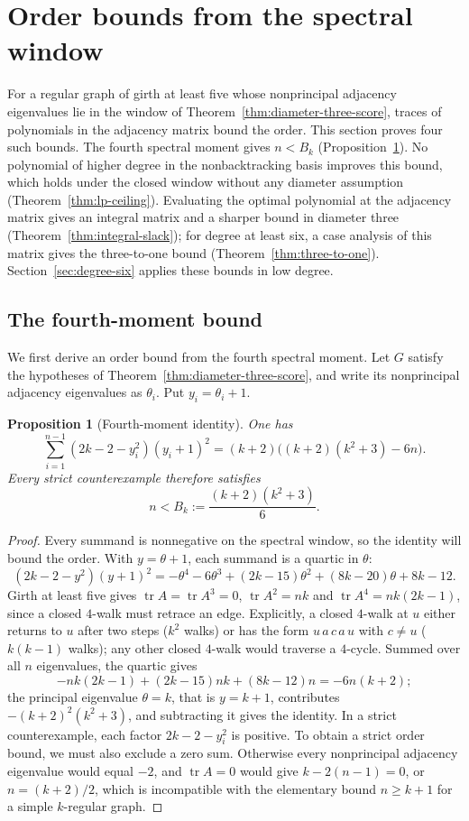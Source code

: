 \documentclass[a4paper,10pt,reqno]{amsart}
\theoremstyle{plain}
\newtheorem{proposition}[theorem]{Proposition}
\theoremstyle{definition}
\theoremstyle{remark}
\newcommand{\tr}{\operatorname{tr}}
\newcommand{\resultbox}[1]{\boxed{#1}}
\begin{document}
\section{Order bounds from the spectral window}\label{sec:lp}

For a regular graph of girth at least five whose nonprincipal adjacency
eigenvalues lie in the window of Theorem~\ref{thm:diameter-three-score},
traces of polynomials in the adjacency matrix bound the order. This section
proves four such bounds. The fourth spectral moment gives \(n<B_k\)
(Proposition~\ref{prop:moment-bound}). No polynomial of higher degree in the
nonbacktracking basis improves this bound, which holds under the closed
window without any diameter assumption (Theorem~\ref{thm:lp-ceiling}).
Evaluating the optimal polynomial at the adjacency matrix gives an integral
matrix and a sharper bound in diameter three
(Theorem~\ref{thm:integral-slack}); for degree at least six, a case analysis
of this matrix gives the three-to-one bound
(Theorem~\ref{thm:three-to-one}). Section~\ref{sec:degree-six} applies these
bounds in low degree.

\subsection{The fourth-moment bound}

We first derive an order bound from the fourth spectral moment.
Let \(G\) satisfy the hypotheses of Theorem~\ref{thm:diameter-three-score}, and
write its nonprincipal adjacency eigenvalues as \(\theta_i\).  Put
\(y_i=\theta_i+1\).

\begin{proposition}[Fourth-moment identity]\label{prop:moment-bound}
One has
\[
 \sum_{i=1}^{n-1}(2k-2-y_i^2)(y_i+1)^2
 =(k+2)\bigl((k+2)(k^2+3)-6n\bigr).
\]
Every strict counterexample therefore satisfies
\[
 \resultbox{
 n< B_k:=\frac{(k+2)(k^2+3)}6.
 }
\]
\end{proposition}

\begin{proof}
Every summand is nonnegative on the spectral window, so the identity
will bound the order. With \(y=\theta+1\), each summand is a quartic in
\(\theta\):
\[
 (2k-2-y^2)(y+1)^2=-\theta^4-6\theta^3+(2k-15)\theta^2+(8k-20)\theta+8k-12.
\]
Girth at least five gives \(\tr A=\tr A^3=0\), \(\tr A^2=nk\) and
\(\tr A^4=nk(2k-1)\), since a closed \(4\)-walk must retrace an edge.
Explicitly, a closed \(4\)-walk at \(u\) either returns to \(u\) after two
steps (\(k^2\) walks) or has the form \(u\,a\,c\,a\,u\) with \(c\ne u\)
(\(k(k-1)\) walks); any other closed \(4\)-walk would traverse a
\(4\)-cycle. Summed over all \(n\) eigenvalues, the quartic gives
\[
 -nk(2k-1)+(2k-15)nk+(8k-12)n=-6n(k+2);
\]
the principal eigenvalue \(\theta=k\), that is \(y=k+1\), contributes
\(-(k+2)^2(k^2+3)\), and subtracting it gives the identity.
In a strict counterexample, each factor \(2k-2-y_i^2\) is positive.
To obtain a strict order bound, we must also exclude a zero sum. Otherwise every nonprincipal adjacency eigenvalue would equal
\(-2\), and \(\tr A=0\) would give
\(k-2(n-1)=0\), or \(n=(k+2)/2\), which is incompatible with the elementary
bound \(n\ge k+1\) for a simple \(k\)-regular graph.
\end{proof}
\end{document}
